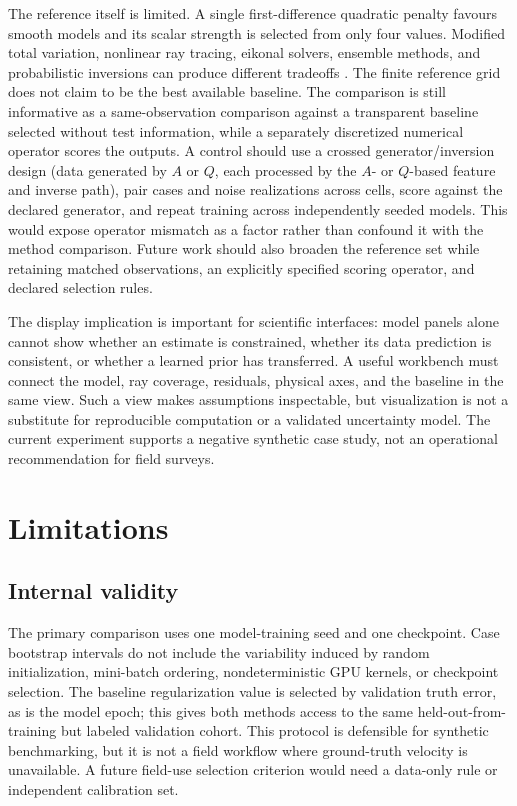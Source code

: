 \documentclass[11pt]{article}
\begin{document}
The reference itself is limited. A single first-difference quadratic penalty favours smooth models and its scalar strength is selected from only four values. Modified total variation, nonlinear ray tracing, eikonal solvers, ensemble methods, and probabilistic inversions can produce different tradeoffs \cite{Jiang2016,Jiang2018,LiEKI2025,Zhao2022}. The finite reference grid does not claim to be the best available baseline. The comparison is still informative as a same-observation comparison against a transparent baseline selected without test information, while a separately discretized numerical operator scores the outputs. A control should use a crossed generator/inversion design (data generated by $A$ or $Q$, each processed by the $A$- or $Q$-based feature and inverse path), pair cases and noise realizations across cells, score against the declared generator, and repeat training across independently seeded models. This would expose operator mismatch as a factor rather than confound it with the method comparison. Future work should also broaden the reference set while retaining matched observations, an explicitly specified scoring operator, and declared selection rules.

The display implication is important for scientific interfaces: model panels alone cannot show whether an estimate is constrained, whether its data prediction is consistent, or whether a learned prior has transferred. A useful workbench must connect the model, ray coverage, residuals, physical axes, and the baseline in the same view. Such a view makes assumptions inspectable, but visualization is not a substitute for reproducible computation or a validated uncertainty model. The current experiment supports a negative synthetic case study, not an operational recommendation for field surveys.

\section{Limitations}
\label{sec:limitations}
\subsection{Internal validity}
\label{sec:internal-validity}
The primary comparison uses one model-training seed and one checkpoint. Case bootstrap intervals do not include the variability induced by random initialization, mini-batch ordering, nondeterministic GPU kernels, or checkpoint selection. The baseline regularization value is selected by validation truth error, as is the model epoch; this gives both methods access to the same held-out-from-training but labeled validation cohort. This protocol is defensible for synthetic benchmarking, but it is not a field workflow where ground-truth velocity is unavailable. A future field-use selection criterion would need a data-only rule or independent calibration set.
\end{document}
